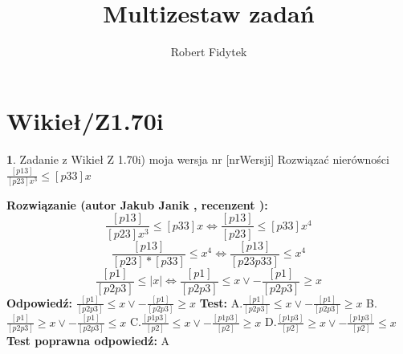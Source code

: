 \documentclass[12pt, a4paper]{article}
\title{Multizestaw zadań}
\author{Robert Fidytek}
\date{}
\theoremstyle{definition} %
\newtheorem{zad}{}
\newcommand{\kategoria}[1]{\section{#1}} %
\newcommand{\zadStart}[1]{\begin{zad}#1\newline} %
\newcommand{\zadStop}{\end{zad}}   %
\newcommand{\rozwStart}[2]{\noindent \textbf{Rozwiązanie (autor #1 , recenzent #2): }\newline} %
\newcommand{\rozwStop}{\newline}                                            %
\newcommand{\odpStart}{\noindent \textbf{Odpowiedź:}\newline}    %
\newcommand{\odpStop}{\newline}                                             %
\newcommand{\testStart}{\noindent \textbf{Test:}\newline} %
\newcommand{\testStop}{\newline} %
\newcommand{\kluczStart}{\noindent \textbf{Test poprawna odpowiedź:}\newline} %
\newcommand{\kluczStop}{\newline} %
\begin{document}
\maketitle


\kategoria{Wikieł/Z1.70i}
\zadStart{Zadanie z Wikieł Z 1.70i) moja wersja nr [nrWersji]}
Rozwiązać nierówności $\frac{[p13]}{[p23]x^3} \leq [p33]x$
\zadStop
\rozwStart{Jakub Janik}{}
$$\frac{[p13]}{[p23]x^3} \leq [p33]x \Leftrightarrow \frac{[p13]}{[p23]} \leq [p33]x^4$$
$$\frac{[p13]}{[p23]*[p33]} \leq x^4 \Leftrightarrow \frac{[p13]}{[p23p33]} \leq x^4$$
$$\frac{[p1]}{[p2p3]} \leq |x| \Leftrightarrow \frac{[p1]}{[p2p3]} \leq x \lor -\frac{[p1]}{[p2p3]} \geq x$$
\rozwStop
\odpStart
$\frac{[p1]}{[p2p3]} \leq x \lor -\frac{[p1]}{[p2p3]} \geq x$
\odpStop
\testStart
A.$\frac{[p1]}{[p2p3]} \leq x \lor -\frac{[p1]}{[p2p3]} \geq x$
B.$\frac{[p1]}{[p2p3]} \geq x \lor -\frac{[p1]}{[p2p3]} \leq x$
C.$\frac{[p1p3]}{[p2]} \leq x \lor -\frac{[p1p3]}{[p2]} \geq x$
D.$\frac{[p1p3]}{[p2]} \geq x \lor -\frac{[p1p3]}{[p2]} \leq x$
\testStop
\kluczStart
A
\kluczStop
\end{document}
